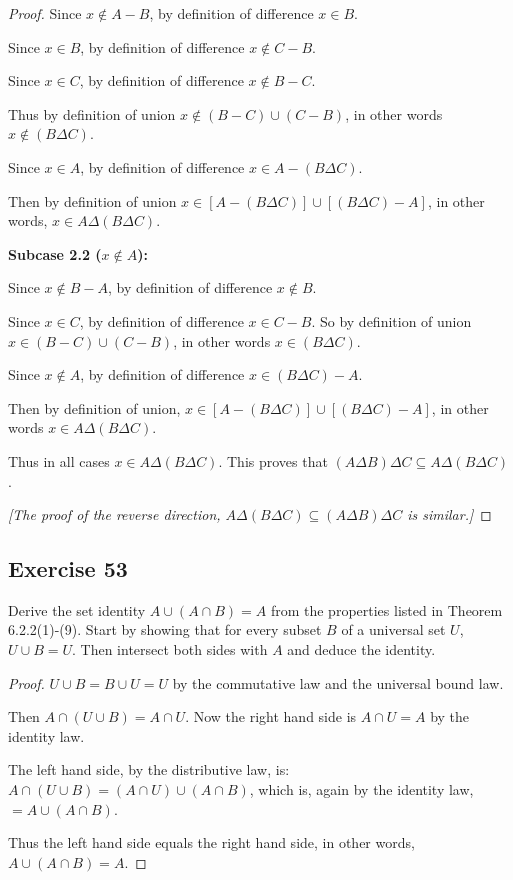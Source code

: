\documentclass[14pt]{extarticle}
\begin{document}
\begin{proof}
Since \(x \notin A - B\), by definition of difference \(x \in B\).

Since \(x \in B\), by definition of difference \(x \notin C - B\).

Since \(x \in C\), by definition of difference \(x \notin B - C\).

Thus by definition of union \(x \notin (B-C) \cup (C-B)\), in other words \(x \notin (B \Delta C)\).

Since \(x \in A\), by definition of difference \(x \in A - (B \Delta C)\). 

Then by definition of union \(x \in [A - (B \Delta C)] \cup [(B \Delta C) - A]\), in other words, 
\(x \in A \Delta(B \Delta C)\). 

{\bf Subcase 2.2 (\(x \notin A\)):}

Since \(x \notin B-A\), by definition of difference \(x \notin B\).

Since \(x \in C\), by definition of difference \(x \in C - B\). So by definition of union \(x \in (B-C) \cup (C-B)\),
in other words \(x \in (B \Delta C)\).

Since \(x \notin A\), by definition of difference \(x \in (B \Delta C) - A\). 

Then by definition of union, \(x \in [A - (B \Delta C)] \cup [(B \Delta C) - A]\), in other words 
\(x \in A \Delta (B \Delta C)\).

Thus in all cases \(x \in A \Delta (B \Delta C)\). This proves that 
\((A \Delta B) \Delta C \subseteq A \Delta (B \Delta C)\).

{\it [The proof of the reverse direction, \(A \Delta (B \Delta C) \subseteq (A \Delta B) \Delta C\) is similar.]}
\end{proof}

\subsection{Exercise 53}
Derive the set identity \(A \cup (A \cap B) = A\) from the properties listed in Theorem 6.2.2(1)-(9). Start by showing 
that for every subset $B$ of a universal set $U$, \(U \cup B = U\). Then intersect both sides with $A$ and deduce the identity.

\begin{proof}
\(U \cup B = B \cup U = U\) by the commutative law and the universal bound law.

Then \(A \cap (U \cup B) = A \cap U\). Now the right hand side is \(A \cap U = A\) by the identity law.

The left hand side, by the distributive law, is: \(A \cap (U \cup B) = (A \cap U) \cup (A \cap B)\), which is, again
by the identity law, \(= A \cup (A \cap B)\).

Thus the left hand side equals the right hand side, in other words, \(A \cup (A \cap B) = A\).
\end{proof}
\end{document}
